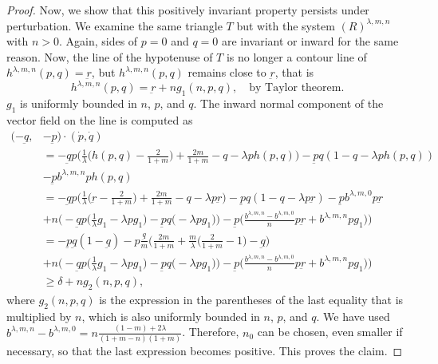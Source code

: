 \documentclass[a4paper,11pt]{article}
\numberwithin{step}{dummy}
\begin{document}
\begin{proof}
Now, we show that this positively invariant property persists under perturbation. We examine the same triangle $T$ but with  the system ${(R)}^{\lambda,m,n}$ with $n>0$. %
Again, sides of $p=0$ and $q=0$ are invariant or inward for the same reason. Now, the line of the hypotenuse of $T$ is no longer a contour line of $h^{ \lambda,m,n}(p,q)=\underbar{r}$, but $h^{ \lambda,m,n}(p,q)$ remains close to $\underbar{r}$, that is 
$$h^{ \lambda,m,n}(p,q) = \underbar{r} + ng_1(n,p,q), \quad \text{by Taylor theorem.}$$ 
{$g_1$ is uniformly bounded  in $n$, $p$, and $q$.} The inward normal component of the vector field on the line is computed as
\begin{align*} 
 (-\underbar{q}, &-\underbar{p}) \cdot ( \dot{p}, \dot{q} ) \\
 &= -\underbar{q}p\Big(\frac{1}{ \lambda }\big(h(p,q) - \frac{2}{1+m}\big) + \frac{2m}{1+m} -q- \lambda p h(p,q)\Big)-\underbar{p}q(1-q- \lambda p h(p,q)) \\&- \underbar{p}b^{\lambda,m,n}ph(p,q) \\
 &= -\underbar{q}p\Big(\frac{1}{ \lambda }\big(\underbar{r} - \frac{2}{1+m}\big) + \frac{2m}{1+m} -q- \lambda p \underbar{r}\Big)-\underbar{p}q(1-q- \lambda p \underbar{r}) - \underbar{p}b^{\lambda,m,0}p\underbar{r} \\ 
 &+n\Big(-\underbar{q}p\big( \frac{1}{ \lambda } g_1 - \lambda p g_1\big) - \underbar{p}q\big(- \lambda p g_1\big)\Big) - \underbar{p}\big( \frac{b^{\lambda,m,n}-b^{\lambda,m,0}}{n}p\underbar{r} + b^{\lambda,m,n} p g_1\big)\Big)\\
 &=-\underbar{p}\underbar{q}(1-\underbar{q}) - p \frac{\underbar{q}}{m}\Big( \frac{2m}{1+m} + \frac{m}{ \lambda} \big( \frac{2}{1+m}-1 \big) - \underbar{q}\Big)\\
 &+n\Big(-\underbar{q}p\big( \frac{1}{ \lambda } g_1 - \lambda p g_1\big) - \underbar{p}q\big(- \lambda p g_1\big)\Big) - \underbar{p}\big( \frac{b^{\lambda,m,n}-b^{\lambda,m,0}}{n}p\underbar{r} + b^{\lambda,m,n} p g_1\big)\Big)\\
 &\ge \delta + ng_2(n,p,q),
\end{align*}
where $g_2(n,p,q)$ is the expression in the parentheses of the last equality that is multiplied by $n$, which is also uniformly bounded in $n$, $p$, and $q$. We have used $ b^{\lambda,m,n}-b^{\lambda,m,0}=n\frac{(1-m) + 2 \lambda}{(1+m-n)(1+m)}$. 
Therefore, $n_0$ can be chosen, even smaller if necessary, so that the last expression becomes positive. This proves the claim. 
\medskip


\end{proof}
\end{document}
